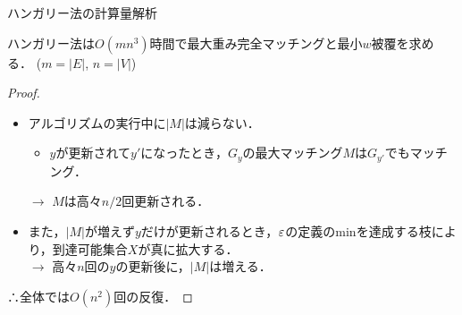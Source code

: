 \documentclass[14pt,aspectratio=169,xcolor=dvipsnames,table,onlytextwidth,dvipdfmx]{beamer}
\begin{document}
\begin{frame}{ハンガリー法の計算量解析}

    \small
    \begin{theorem}
        ハンガリー法は$O(mn^3)$時間で最大重み完全マッチングと最小$w$被覆を求める．
        \hfill {\footnotesize ($m = |E|$, $n = |V|$)}
    \end{theorem}

    \pause
    \begin{proof}
    \begin{itemize}[<+->]
        \item アルゴリズムの実行中に$|M|$は減らない．
        \begin{itemize}
            \item[($\because$)] $y$が更新されて$y'$になったとき，$G_y$の最大マッチング$M$は$G_{y'}$でもマッチング．
        \end{itemize}
        $\longrightarrow$ $M$は高々$n/2$回更新される．

        \item また，$|M|$が増えず$y$だけが更新されるとき，$\varepsilon$の定義のminを達成する枝により，到達可能集合$X$が真に拡大する．\\
        $\longrightarrow$ 高々$n$回の$y$の更新後に，$|M|$は増える．
    \end{itemize}
    \pause
    ∴全体では$O(n^2)$回の反復．
    \end{proof}
\end{frame}
\end{document}

